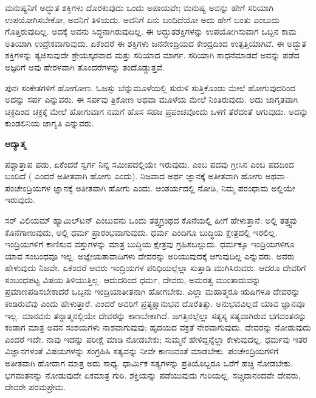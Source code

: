 ಮನುಷ್ಯನಿಗೆ ಅದ್ಭುತ ಶಕ್ತಿಗಳು ದೊರಕುವುದು ಒಂದು ಅಪಾಯವೇ; ಮನುಷ್ಯ ಅವನ್ನು ಹೇಗೆ ಸರಿಯಾಗಿ ಉಪಯೋಗಿಸಬೇಕೋ, ಅವನಿಗೆ ತಿಳಿಯದು. ಅವನಿಗೆ ಏನು ಬಂದಿದೆಯೋ ಅದು ಹೇಗೆ ಬಂತು ಎಂಬುದು ಗೊತ್ತಿರುವುದಿಲ್ಲ. ಅದಕ್ಕೆ ಅವನು ಸಿದ್ಧನಾಗಿರುವುದಿಲ್ಲ. ಈ ಅದ್ಭುತಶಕ್ತಿಗಳನ್ನು ಉಪಯೋಗಿಸುವಾಗ ಒಬ್ಬನ ಕಾಮ ಅತಿಯಾಗಿ ಉದ್ರೇಕವಾಗುವುದು. ಏಕೆಂದರೆ ಈ ಶಕ್ತಿಗಳು ಜನನೇಂದ್ರಿಯದ ಕೇಂದ್ರದಿಂದ ಉತ್ಪತ್ತಿಯಾಗಿವೆ. ಈ ಅದ್ಭುತ ಶಕ್ತಿಗಳನ್ನು ತ್ಯಜಿಸುವುದೇ ಶ್ರೇಯಸ್ಕರವಾದ ಮತ್ತು ಸರಿಯಾದ ಮಾರ್ಗ. ಸರಿಯಾಗಿ ಸಾಧನೆಮಾಡದೆ ಅವನ್ನು ಪಡೆದ ಅಜ್ಞರಿಗೆ ಅವು ಹೇರಳವಾಗಿ ತೊಂದರೆಗಳನ್ನು ತಂದೊಡ್ಡುತ್ತವೆ.

ಪುನಃ ಸಂಕೇತಗಳಿಗೆ ಹೋಗೋಣ. ಓಜಸ್ಸು ಬೆನ್ನುಮೂಳೆಯಲ್ಲಿ ಸುರುಳಿ ಸುತ್ತಿಕೊಂಡು ಮೇಲೆ ಹೋಗುವುದರಿಂದ ಅದನ್ನು ಸರ್ಪ ಎನ್ನುವರು. ಈ ಸರ್ಪವು ತ್ರಿಕೋಣ ಅಥವಾ ಮೂಳೆಯ ಮೇಲೆ ನಿಂತಿರುವುದು. ಅದು ಜಾಗೃತವಾಗಿ ಚಕ್ರದಿಂದ ಚಕ್ರಕ್ಕೆ ಮೇಲೆ ಹೋಗುವಾಗ ನಮಗೆ ಹೊಸ ಸಹಜ ಪ್ರಪಂಚವೊಂದು ಒಳಗೆ ತೆರೆದಂತೆ ಆಗುವುದು. ಅದನ್ನು ಕುಂಡಲಿನಿಯ ಜಾಗೃತಿ ಎನ್ನುವರು.

\begin{center}
\textbf{ಆದ್ಯಾತ್ಮ}
\end{center}

ಪಶ್ಚಾತ್ತಾಪ ಪಡು, ಏಕೆಂದರೆ ಸ್ವರ್ಗ ನಿನ್ನ ಸಮೀಪದಲ್ಲಿಯೇ ಇರುವುದು.  ಎಂಬ ಪದವು ಗ್ರೀಸಿನ  ಎಂಬ ಪದದಿಂದ ಬಂದಿದೆ ( ಎಂದರೆ ಅತೀತವಾಗಿ ಹೋಗು ಎಂದು). ನಿಜವಾದ ಅರ್ಥ ಜ್ಞಾನಕ್ಕೆ ಅತೀತವಾಗಿ ಹೋಗು ಅಥವಾ–ಪಂಚೇಂದ್ರಿಯಗಳ ಜ್ಞಾನಕ್ಕೆ ಅತೀತವಾಗಿ ಹೋಗು ಎಂದು. ಆಂತರ್ಯದಲ್ಲಿ ನೋಡಿ, ನಿಮ್ಮ ಪರಂಧಾಮ ಅಲ್ಲಿಯೇ ಇರುವುದು.

ಸರ್​ ವಿಲಿಯಮ್​ ಹ್ಯಾಮಿಲ್​ಟನ್​ ಎಂಬುವನು ಒಂದು ತತ್ತ್ವಗ್ರಂಥದ ಕೊನೆಯಲ್ಲಿ ಹೀಗೆ ಹೇಳುತ್ತಾನೆ: ಅಲ್ಲಿ ತತ್ತ್ವವು ಕೊನೆಗಾಣುವುದು, ಅಲ್ಲಿ ಧರ್ಮ ಪ್ರಾರಂಭವಾಗುವುದು. ಧರ್ಮ ಎಂದಿಗೂ ಬುದ್ಧಿಯ ಕ್ಷೇತ್ರದಲ್ಲಿ ಇರಲಿಲ್ಲ. ಇಂದ್ರಿಯಗಳಿಗೆ ಕಾಣಿಸುವ ವಸ್ತುಗಳನ್ನು ಮಾತ್ರ ಬುದ್ಧಿಯ ಕ್ಷೇತ್ರವು ಗ್ರಹಿಸಬಲ್ಲುದು. ಧರ್ಮಕ್ಕೂ ಇಂದ್ರಿಯಗಳಿಗೂ ಯಾವ ಸಂಬಂಧವೂ ಇಲ್ಲ. ಅಜ್ಞೇಯತಾವಾದಿಗಳು ದೇವರನ್ನು ಅರಿಯುವುದಕ್ಕೆ ಆಗುವುದಿಲ್ಲ ಎನ್ನುವರು. ಅವರು ಹೇಳುವುದು ನಿಜವೇ. ಏಕೆಂದರೆ ಅವರು ಇಂದ್ರಿಯಗಳ ಪರಿಧಿಯಲ್ಲೆಲ್ಲಾ ಸುತ್ತಾಡಿ ಮುಗಿಸಿರುವರು. ಆದರೂ ದೇವರಿಗೆ ಸಂಬಂಧಪಟ್ಟ ವಿಷಯ ತಿಳಿಯುತ್ತಿಲ್ಲ. ಆದುದರಿಂದ ಧರ್ಮ, ದೇವರು, ಅಮರತ್ವ ಮುಂತಾದುವನ್ನು ಪ್ರಮಾಣಪಡಿಸಬೇಕಾದರೆ ಒಬ್ಬನು ಇಂದ್ರಿಯಾತೀತನಾಗಿ ಹೋಗಬೇಕು. ಎಲ್ಲಾ ಮಹಾತ್ಮರೂ ಋಷಿಗಳೂ ದೇವರನ್ನು ಕಂಡಿರುವೆವು ಎಂದು ಹೇಳುತ್ತಾರೆ. ಎಂದರೆ ಅವರಿಗೆ ಪ್ರತ್ಯಕ್ಷಾನುಭವ ದೊರೆತಿತ್ತು. ಅನುಭವವಿಲ್ಲದೆ ಯಾವ ಜ್ಞಾನವೂ ಇಲ್ಲ. ಮಾನವನು ತನ್ನಾತ್ಮನಲ್ಲಿಯೇ ದೇವರನ್ನು ಕಾಣಬೇಕಾಗಿದೆ. ಜಗತ್ತಿನಲ್ಲೆಲ್ಲಾ ಸತ್ಯಸ್ಯ ಸತ್ಯವಾಗಿರುವ ಭಗವಂತನನ್ನು ಕಂಡಾಗ ಮಾತ್ರ ಅವನ ಸಂಶಯಗಳು ನಾಶವಾಗುವುವು; ಹೃದಯದ ವಕ್ರತೆ ನೇರವಾಗುವುದು. ದೇವರನ್ನು ನೋಡುವುದು ಎಂದರೆ ಇದೇ. ನಾವು ಇದನ್ನು ಪರೀಕ್ಷೆ ಮಾಡಿ ನೋಡಬೇಕು; ಸುಮ್ಮನೆ ಹೇಳಿದ್ದನ್ನೆಲ್ಲಾ ಕೇಳುವುದಲ್ಲ. ಧರ್ಮವು ಇತರ ವಿಜ್ಞಾನಗಳಂತೆ ವಿಷಯಗಳನ್ನು ಸಂಗ್ರಹಿಸಿ ಸತ್ಯವನ್ನು ನೀವೇ ಕಾಣುವಂತೆ ಮಾಡಬೇಕು. ಪಂಚೇಂದ್ರಿಯಗಳಿಗೆ ಅತೀತವಾಗಿ ಹೋದಾಗ ಮಾತ್ರ ಅದು ಸಾಧ್ಯ. ಧಾರ್ಮಿಕ ಸತ್ಯಗಳನ್ನು ಪ್ರತಿಯೊಬ್ಬರೂ ಒರೆಗೆ ಹಚ್ಚಿ ನೋಡಬೇಕು. ಭಗವಂತನನ್ನು ನೋಡುವುದೇ ಏಕಮಾತ್ರ ಗುರಿ. ಶಕ್ತಿಯನ್ನು ಪಡೆಯುವುದು ಗುರಿಯಲ್ಲ. ಸಚ್ಚಿದಾನಂದವೇ ದೇವರು, ದೇವರೇ ಪರಮಪ್ರೇಮ.

